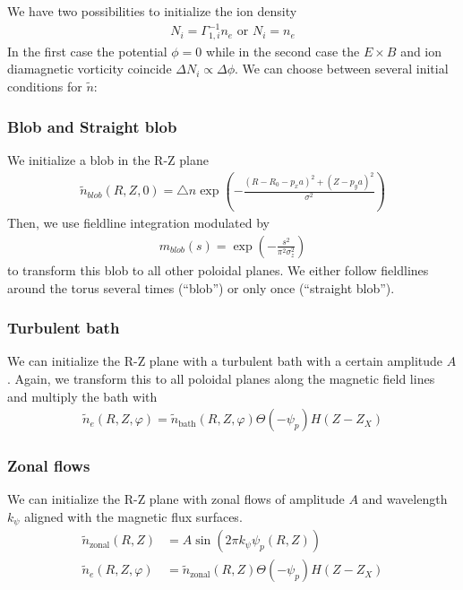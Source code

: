 We have two possibilities to initialize the ion density
\begin{align} \label{eq:initphi}
  N_i = \Gamma_{1,i}^{-1} n_e \text{ or } N_i = n_e
\end{align}
In the first case the potential $\phi= 0$ while in the second case
the $E\times B$ and ion diamagnetic vorticity coincide $\Delta N_i \propto \Delta \phi$.
We can choose between several initial conditions for $\tilde n$:

\subsubsection{Blob and Straight blob}
We initialize a blob in the R-Z plane
\begin{align} \label{eq:initial_blob}
  \tilde n_{blob}(R,Z,0) = \triangle n \exp\left( -\frac{(R - R_0 - p_x a)^2 + (Z-p_ya)^2}{\sigma^2} \right)
\end{align}
Then, we use fieldline integration modulated by 
\begin{align}
  m_{blob}(s) = \exp\left( -\frac{s^2 }{\pi^2\sigma_z^2} \right)
\end{align}
to transform this blob to all other poloidal
planes.
We either follow fieldlines around the torus several times (``blob'') or only once
(``straight blob'').
\subsubsection{Turbulent bath}
We can initialize the R-Z plane with a turbulent bath with a certain amplitude $A$.
Again, we transform this to all poloidal planes along the magnetic field lines and multiply the bath with
\begin{align} \label{eq:initial_turbulent}
\tilde n_e(R,Z,\varphi) = \tilde n_{\text{bath}}(R,Z,\varphi)\Theta(-\psi_p)H(Z-Z_X)
\end{align}
\subsubsection{Zonal flows}
We can initialize the R-Z plane with zonal flows of amplitude $A$ and
wavelength $k_\psi$ aligned with the magnetic flux surfaces.
\begin{align} \label{eq:initial_zonal_flow}
    \tilde n_{\text{zonal}}(R,Z) &= A \sin (2\pi k_\psi \psi_p(R,Z)) \nonumber\\
\tilde n_e(R,Z,\varphi) &= \tilde n_{\text{zonal}}(R,Z)\Theta(-\psi_p)H(Z-Z_X)
\end{align}

